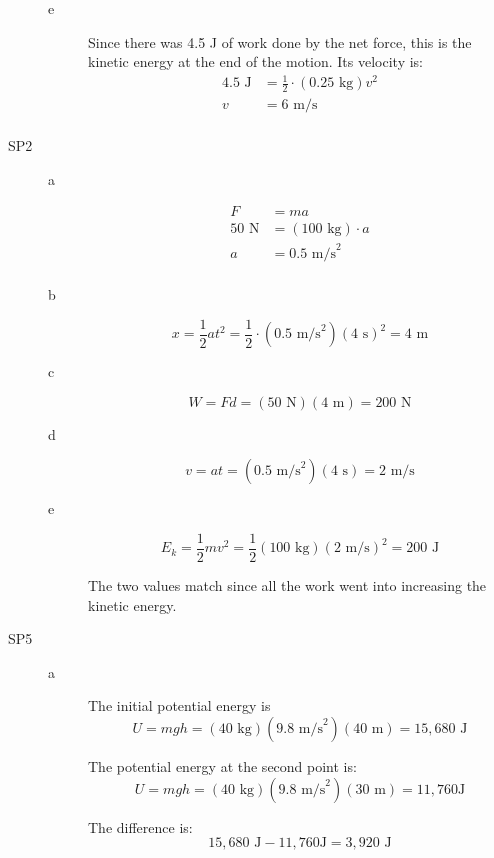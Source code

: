 \documentclass{exam}
\begin{document}
\begin{description}
\begin{description}
\item[e]
Since there was 4.5 J of work done by the net force, this is the kinetic energy at the end of the motion.  Its velocity
is:
\begin{align*}
  4.5 \text{ J} &= \frac{1}{2} \cdot (0.25 \text{ kg}) v^2 \\
  v &= 6 \text{ m/s} \\
\end{align*}

\end{description}

\item[SP2]
\begin{description}
\item[a]
\begin{align*}
  F &= ma \\
  50 \text{ N} &= (100 \text{ kg}) \cdot a \\
  a &= 0.5 \text{ m/s}^2 \\
\end{align*}

\item[b]
\[
  x = \frac{1}{2} at^2 = \frac{1}{2} \cdot (0.5 \text{ m/s}^2)(4 \text{ s})^2  = 4 \text{ m}
\]

\item[c]
\[
  W = Fd = (50 \text{ N})(4 \text{ m}) = 200 \text{ N}
\]

\item[d]
\[
  v = at = (0.5 \text{ m/s}^2)(4 \text{ s}) = 2 \text{ m/s}
\]

\item[e]
\[
  E_k = \frac{1}{2} mv^2 = \frac{1}{2} (100 \text{ kg}) (2 \text{ m/s})^2 = 200 \text{ J}
\]

The two values match since all the work went into increasing the kinetic energy.

\end{description}

\item[SP5]

\begin{description}
\item[a]
The initial potential energy is 
\[
  U = mgh = (40 \text{ kg})(9.8 \text{ m/s}^2)(40 \text{ m}) = 15,680 \text{ J}
\]

The potential energy at the second point is: 
\[
  U = mgh = (40 \text{ kg})(9.8 \text{ m/s}^2)(30 \text{ m}) = 11,760 \text{J}
\]

The difference is:
\[
  15,680 \text{ J} - 11,760 \text{J} = 3,920 \text{ J}
\]


\end{description}
\end{description}
\end{document}
